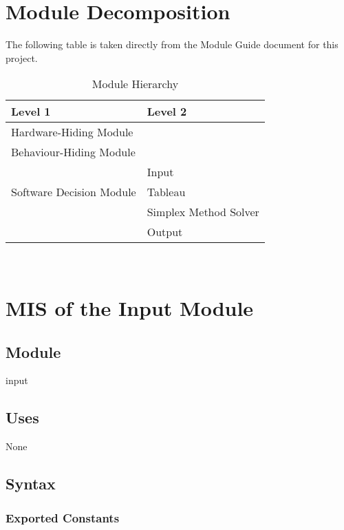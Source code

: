 \documentclass[12pt, titlepage]{article}
\begin{document}
\section{Module Decomposition}

The following table is taken directly from the Module Guide document for this project.

\begin{table}[h!]
	\centering
	\begin{tabular}{p{} p{}}
		\toprule
		\textbf{Level 1} & \textbf{Level 2}\\
		\midrule
		
		{Hardware-Hiding Module} & ~ \\
		\midrule
		
		{Behaviour-Hiding Module} & ~ \\
		\midrule
		
		\multirow{3}{0.3\textwidth}{Software Decision Module}
		& Input\\ 
		& Tableau\\
		& Simplex Method Solver\\
		& Output\\
		\bottomrule
	\end{tabular}
	\caption{Module Hierarchy}
	\label{TblMH}
\end{table}

\newpage
~\newpage

\section{MIS of the Input Module} \label{M_IM} 

\subsection{Module}

input

\subsection{Uses}

None

\subsection{Syntax}

\subsubsection{Exported Constants}
\end{document}

